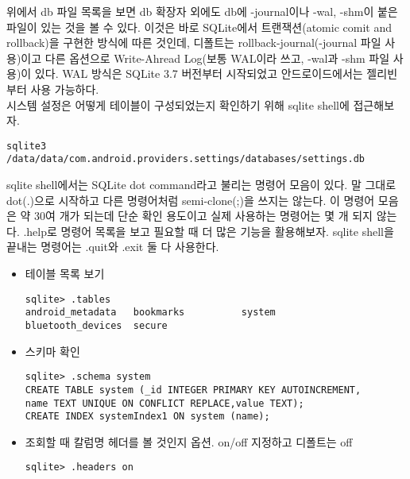 위에서 db 파일 목록을 보면 db 확장자 외에도 db에 -journal이나 -wal, -shm이 붙은 파일이 있는 것을 볼 수 있다.
이것은 바로 SQLite에서 트랜잭션(atomic comit and rollback)을 구현한 방식에 따른 것인데, 디폴트는 rollback-journal(-journal 파일 사용)이고 다른 옵션으로 Write-Ahread Log(보통 WAL이라 쓰고, -wal과 -shm 파일 사용)이 있다.
WAL 방식은 SQLite 3.7 버전부터 시작되었고 안드로이드에서는 젤리빈부터 사용 가능하다.\\ 

시스템 설정은 어떻게 테이블이 구성되었는지 확인하기 위해 sqlite shell에 접근해보자.
\begin{lstlisting}[frame=single] 
sqlite3 /data/data/com.android.providers.settings/databases/settings.db
\end{lstlisting}

sqlite shell에서는 SQLite dot command라고 불리는 명령어 모음이 있다.
말 그대로 dot(.)으로 시작하고 다른 명령어처럼 semi-clone(;)을 쓰지는 않는다. 이 명령어 모음은 약 30여 개가 되는데 단순 확인 용도이고 실제 사용하는 명령어는 몇 개 되지 않는다.
.help로 명령어 목록을 보고 필요할 때 더 많은 기능을 활용해보자.
sqlite shell을 끝내는 명령어는 .quit와 .exit 둘 다 사용한다.
\begin{itemize}
\item 테이블 목록 보기
\begin{verbatim}
sqlite> .tables       
android_metadata   bookmarks          system           
bluetooth_devices  secure       
\end{verbatim}
\item 스키마 확인
\begin{verbatim}
sqlite> .schema system
CREATE TABLE system (_id INTEGER PRIMARY KEY AUTOINCREMENT,
name TEXT UNIQUE ON CONFLICT REPLACE,value TEXT);
CREATE INDEX systemIndex1 ON system (name);
\end{verbatim}
\item 조회할 때 칼럼명 헤더를 볼 것인지 옵션. on/off 지정하고 디폴트는 off
\begin{verbatim}
sqlite> .headers on 
\end{verbatim}
\end{itemize}

